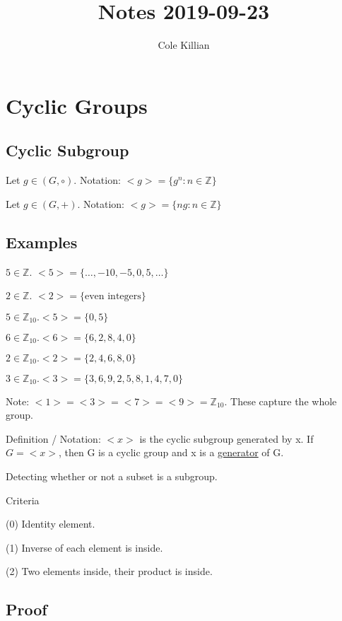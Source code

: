\documentclass[class=scrartcl, crop=false]{standalone}
\begin{document}
\title{Notes 2019-09-23}
\author{Cole Killian}

\section{Cyclic Groups}


\subsection{Cyclic Subgroup}

Let $g \in (G, \circ)$. Notation: $<g> = \{g^n: n \in \mathbb{Z}\}$

Let $g \in (G, +)$. Notation: $<g> = \{ng: n \in \mathbb{Z}\}$

\subsection{Examples}
$5 \in \mathbb{Z}$. $<5> = \{\dots, -10, -5, 0, 5, \dots\}$

$2 \in \mathbb{Z}$. $<2> = \{\text{even integers}\}$

$5 \in \mathbb{Z}_{10}. <5> = \{0, 5\}$

$6 \in \mathbb{Z}_{10}. <6> = \{6, 2, 8, 4, 0\}$

$2 \in \mathbb{Z}_{10}. <2> = \{2, 4, 6, 8, 0\}$

$3 \in \mathbb{Z}_{10}. <3> = \{3, 6, 9, 2, 5, 8, 1, 4, 7, 0\}$ 

Note: $<1> = <3> = <7> = <9> = \mathbb{Z}_{10}$. These capture the whole group.




Definition / Notation: $<x>$ is the cyclic subgroup generated by x. If $G = <x>$, then G is a cyclic group and x is a \underline{generator} of G.

Detecting whether or not a subset is a subgroup.

Criteria

(0) Identity element.

(1) Inverse of each element is inside.

(2) Two elements inside, their product is inside.


\subsection{Proof}
\end{document}
